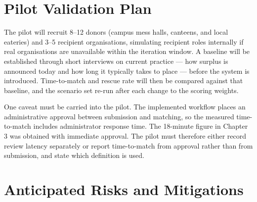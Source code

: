 \documentclass[12pt,a4paper]{report}
\begin{document}
\section{Pilot Validation Plan}

The pilot will recruit 8--12 donors (campus mess halls, canteens, and local eateries) and 3--5 recipient organisations, simulating recipient roles internally if real organisations are unavailable within the iteration window. A baseline will be established through short interviews on current practice --- how surplus is announced today and how long it typically takes to place --- before the system is introduced. Time-to-match and rescue rate will then be compared against that baseline, and the scenario set re-run after each change to the scoring weights.

One caveat must be carried into the pilot. The implemented workflow places an administrative approval between submission and matching, so the measured time-to-match includes administrator response time. The 18-minute figure in Chapter 3 was obtained with immediate approval. The pilot must therefore either record review latency separately or report time-to-match from approval rather than from submission, and state which definition is used.

\section{Anticipated Risks and Mitigations}
\end{document}
